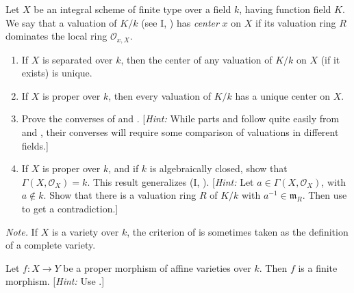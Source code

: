 {\begin{description}[leftmargin=2.4em,labelindent=0pt,topsep=3pt,itemsep=4pt,parsep=0pt]
\item[\hypertarget{ex-II-4.5}{}\textbf{4.5.}] Let $X$ be an integral scheme of finite type over a field $k$, having function field $K$. We say that a valuation of $K/k$ (see I, ) has \emph{center} $x$ on $X$ if its valuation ring $R$ dominates the local ring $\mathcal O_{x,X}$.
\begin{enumerate}[label=(\alph*),leftmargin=1.6em,nosep]
\item[\hypertarget{ex-II-4.5a}{}(a)] If $X$ is separated over $k$, then the center of any valuation of $K/k$ on $X$ (if it exists) is unique.
\item[\hypertarget{ex-II-4.5b}{}(b)] If $X$ is proper over $k$, then every valuation of $K/k$ has a unique center on $X$.
\item[*(c)] Prove the converses of  and . [\emph{Hint:} While parts  and  follow quite easily from  and , their converses will require some comparison of valuations in different fields.]
\item[(d)] If $X$ is proper over $k$, and if $k$ is algebraically closed, show that $\Gamma(X,\mathcal O_X)=k$. This result generalizes (I, ). [\emph{Hint:} Let $a\in\Gamma(X,\mathcal O_X)$, with $a\notin k$. Show that there is a valuation ring $R$ of $K/k$ with $a^{-1}\in\mathfrak m_R$. Then use  to get a contradiction.]
\end{enumerate}
\emph{Note.} If $X$ is a variety over $k$, the criterion of  is sometimes taken as the definition of a complete variety.

\item[\hypertarget{ex-II-4.6}{}\textbf{4.6.}] Let $f\colon X\to Y$ be a proper morphism of affine varieties over $k$. Then $f$ is a finite morphism. [\emph{Hint:} Use .]


\end{description}}
